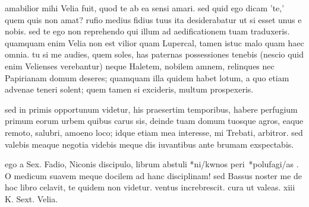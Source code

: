 


 amabilior mihi Velia fuit, quod te ab ea sensi amari. sed quid ego dicam 'te,' quem quis non amat? rufio medius fidius tuus ita desiderabatur ut si esset unus e nobis. sed te ego non reprehendo qui illum ad aedificationem tuam traduxeris. quamquam enim Velia non est vilior quam Lupercal, tamen istuc malo quam haec omnia. tu si me audies, quem soles, has paternas possessiones tenebis (nescio quid enim Velienses verebantur) neque Haletem, nobilem amnem, relinques nec Papirianam domum deseres; quamquam illa quidem habet lotum, a quo etiam advenae teneri solent; quem tamen si excideris, multum prospexeris.

 sed in primis opportunum videtur, his praesertim temporibus, habere perfugium primum eorum urbem quibus carus sis, deinde tuam domum tuosque agros, eaque remoto, salubri, amoeno loco; idque etiam mea interesse, mi Trebati, arbitror. sed valebis meaque negotia videbis meque dis iuvantibus ante brumam exspectabis.

 ego a Sex. Fadio, Niconis discipulo, librum abstuli *ni/kwnos peri\ *polufagi/as . O medicum suavem meque docilem ad hanc disciplinam! sed Bassus noster me de hoc libro celavit, te quidem non videtur. ventus increbrescit. cura ut valeas. xiii K. Sext. Velia.
